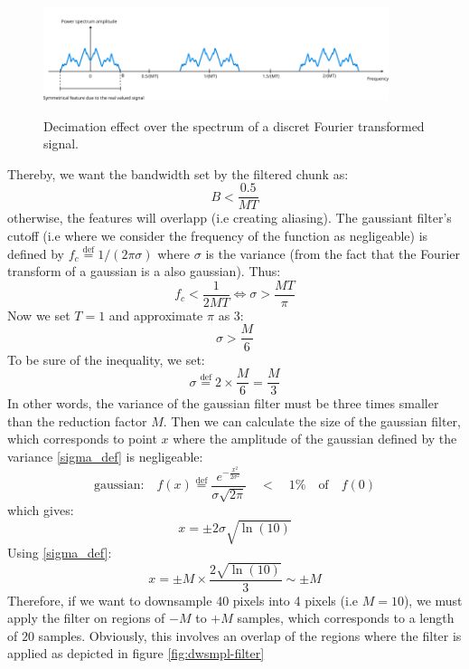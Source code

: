 \documentclass[10pt]{report}
\begin{document}
\begin{figure}[h!]
\caption{Decimation effect over the spectrum of a discret Fourier transformed signal.}
\centering
\includegraphics[width=0.9\textwidth]{dwsmpl-freq}
\label{fig:dwsmpl-freq}
\end{figure}

Thereby, we want the bandwidth set by the filtered chunk as:
\begin{equation}
B < \frac{0.5}{MT}
\end{equation}
otherwise, the features will overlapp (i.e creating aliasing). The gaussiant filter's cutoff (i.e where we consider the frequency of the function as negligeable) is defined by $f_c \stackrel{\text{def}}{=} 1/(2\pi \sigma)$ where $\sigma$ is the variance (from the fact that the Fourier transform of a gaussian is a also gaussian). Thus:
\begin{equation}
f_c < \frac{1}{2MT} \Leftrightarrow \sigma > \frac{MT}{\pi}
\end{equation}
Now we set $T=1$ and approximate $\pi$ as 3:
\begin{equation}
\sigma > \frac{M}{6}
\end{equation}
To be sure of the inequality, we set:
\begin{equation}
\label{sigma_def}
\sigma \stackrel{\text{def}}{=} 2\times\frac{M}{6} = \frac{M}{3}
\end{equation}
In other words, the variance of the gaussian filter must be three times smaller than the reduction factor $M$. Then we can calculate the size of the gaussian filter, which corresponds to point $x$ where the amplitude of the gaussian defined by the variance \eqref{sigma_def} is negligeable:
\begin{equation}
\textrm{gaussian:} \quad f(x) \stackrel{\text{def}}{=} \frac{e^{-\frac{x^2}{2\sigma^2}}}{\sigma\sqrt{2\pi}} \quad < \quad 1\% \quad \textrm{of} \quad f(0)
\end{equation}
which gives:
\begin{equation}
x = \pm 2\sigma\sqrt{\ln(10)}
\end{equation}
Using \eqref{sigma_def}:
\begin{equation}
x = \pm M \times \frac{2\sqrt{\ln(10)}}{3} \sim \pm M
\end{equation}
Therefore, if we want to downsample 40 pixels into 4 pixels (i.e $M = 10$), we must apply the filter on regions of $-M$ to $+M$ samples, which corresponds to a length of $20$ samples. Obviously, this involves an overlap of the regions where the filter is applied as depicted in figure \ref{fig:dwsmpl-filter}
\end{document}
